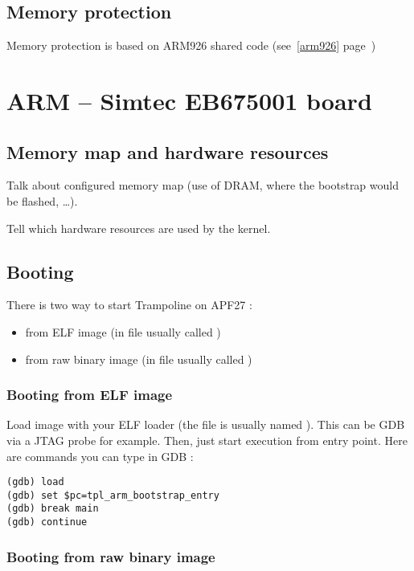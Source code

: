 \subsection{Memory protection}

Memory protection is based on ARM926 shared code (see~\ref{arm926} page~\pageref{arm926})

\section{ARM -- Simtec EB675001 board}

\subsection{Memory map and hardware resources}

Talk about configured memory map (use of DRAM, where the bootstrap would be flashed, \ldots).

Tell which hardware resources are used by the kernel.

\subsection{Booting}

There is two way to start Trampoline on APF27 :
\begin{itemize}
\item from ELF image (in file usually called )
\item from raw binary image (in file usually called )
\end{itemize}

\subsubsection{Booting from ELF image}

Load image with your ELF loader (the file is usually named ). This can be GDB via a JTAG probe for example. Then, just start execution from  entry point. Here are commands you can type in GDB :
\begin{lstlisting}
(gdb) load
(gdb) set $pc=tpl_arm_bootstrap_entry
(gdb) break main
(gdb) continue
\end{lstlisting}

\subsubsection{Booting from raw binary image}

